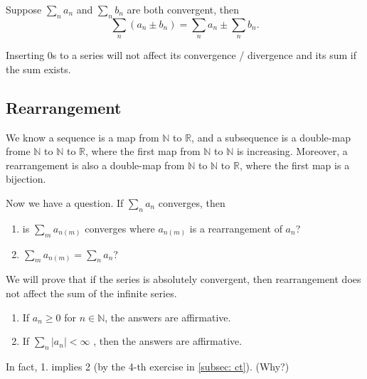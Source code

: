 \begin{exercise}
    Suppose \(\sum_{n} a_n \) and \(\sum_{n} b_n \) are both convergent, then 
\[
    \sum_{n} \left( a_n \pm b_n \right) = \sum_{n} a_n \pm \sum_{n} b_n.  
\]
\end{exercise}

\begin{exercise}
    Inserting \(0\)s to a series will not affect its convergence / divergence and its sum if the sum exists. 
\end{exercise}

\subsection{Rearrangement}

\begin{definition}
    We know a sequence is a map from \(\mathbb{N} \) to \(\mathbb{R} \), and a subsequence is a double-map frome \(\mathbb{N} \) to \(\mathbb{N} \) to \(\mathbb{R} \), where the first map from \(\mathbb{N} \) to \(\mathbb{N} \) is increasing. Moreover, a rearrangement is also a double-map from \(\mathbb{N} \) to \(\mathbb{N} \) to \(\mathbb{R} \), where the first map is a bijection.           
\end{definition}

Now we have a question. If \(\sum_{n} a_n \) converges, then 
\begin{enumerate}
    \item is \(\sum_{m} a_{n(m)} \) converges where \(a_{n(m)}\) is a rearrangement of \(a_n\)?
    \item \(\sum_{m} a_{n(m)} = \sum_{n} a_n \)?    
\end{enumerate} 

\begin{note}
    We will prove that if the series is absolutely convergent, then rearrangement does not affect the sum of the infinite series.
\end{note}

\begin{enumerate}
    \item If \(a_n \ge 0\) for \(n \in \mathbb{N} \), the answers are affirmative. 

    \item If \(\sum_{n} \vert a_n \vert < \infty  \) , then the answers are affirmative.
\end{enumerate}
In fact, 1. implies 2 (by the 4-th exercise in \autoref{subsec: ct}). (Why?)

